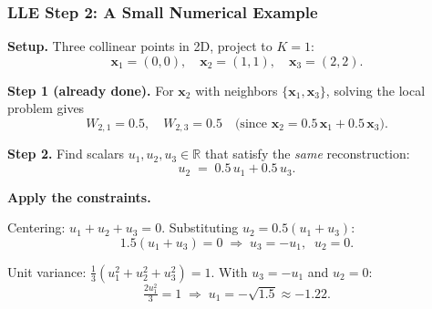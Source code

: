 \documentclass[notes,11pt, aspectratio=169]{beamer}
\newcommand{\vx}{\mathbf{x}}
\newcommand{\R}{\mathbb{R}}
\begin{document}
\begin{frame}
\frametitle{LLE Step 2: A Small Numerical Example}

\textbf{Setup.} Three collinear points in 2D, project to $K = 1$:
\[
    \vx_1 = (0, 0), \quad \vx_2 = (1, 1), \quad \vx_3 = (2, 2).
\]

\vspace{4pt}
\textbf{Step 1 (already done).} For $\vx_2$ with neighbors $\{\vx_1, \vx_3\}$, solving the local problem gives
\[
    W_{2,1} = 0.5, \quad W_{2,3} = 0.5
    \quad\text{(since $\vx_2 = 0.5\,\vx_1 + 0.5\,\vx_3$)}.
\]

\vspace{4pt}
\textbf{Step 2.} Find scalars $u_1, u_2, u_3 \in \R$ that satisfy the \emph{same} reconstruction:
\[
    u_2 \;=\; 0.5\,u_1 + 0.5\,u_3.
\]

\vspace{4pt}
\textbf{Apply the constraints.}

\vspace{2pt}
Centering: $u_1 + u_2 + u_3 = 0$. Substituting $u_2 = 0.5(u_1 + u_3)$:
\[
    1.5(u_1 + u_3) = 0 \;\Rightarrow\; u_3 = -u_1, \;\; u_2 = 0.
\]

Unit variance: $\tfrac{1}{3}(u_1^2 + u_2^2 + u_3^2) = 1$. With $u_3 = -u_1$ and $u_2 = 0$:
\[
    \tfrac{2u_1^2}{3} = 1 \;\Rightarrow\; u_1 = -\sqrt{1.5} \approx -1.22.
\]
\end{frame}
\end{document}
